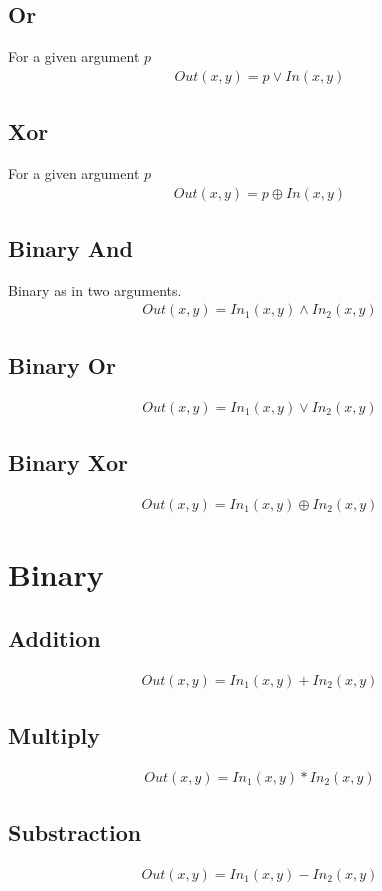 \documentclass{article}
\begin{document}
\subsection{Or}
For a given argument $p$
\begin{gather*}
    Out(x,y) = p \lor In(x, y)
\end{gather*}
\subsection{Xor}
For a given argument $p$
\begin{gather*}
    Out(x,y) = p \oplus In(x, y)
\end{gather*}
\subsection{Binary And}
Binary as in two arguments.
\begin{gather*}
    Out(x, y) = In_1(x, y) \land In_2(x,y)
\end{gather*}
\subsection{Binary Or}
\begin{gather*}
    Out(x, y) = In_1(x, y) \lor In_2(x,y)
\end{gather*}
\subsection{Binary Xor}
\begin{gather*}
    Out(x, y) = In_1(x, y) \oplus In_2(x,y)
\end{gather*}
\section{Binary}
\subsection{Addition}
\begin{gather*}
    Out(x, y) = In_1(x, y) + In_2(x,y)
\end{gather*}
\subsection{Multiply}
\begin{gather*}
    Out(x, y) = In_1(x, y) * In_2(x,y)
\end{gather*}
\subsection{Substraction}
\begin{gather*}
    Out(x, y) = In_1(x, y) - In_2(x,y)
\end{gather*}
\end{document}
